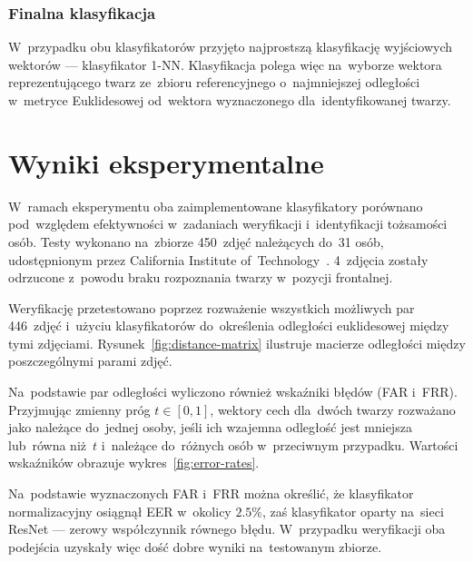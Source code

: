 \documentclass[11pt,a4paper]{article}
\begin{document}
\subsubsection{Finalna klasyfikacja}

W~przypadku obu klasyfikatorów przyjęto najprostszą klasyfikację wyjściowych wektorów --- klasyfikator 1-NN.
Klasyfikacja polega więc na~wyborze wektora reprezentującego twarz ze~zbioru referencyjnego o~najmniejszej odległości w~metryce Euklidesowej od~wektora wyznaczonego dla~identyfikowanej twarzy.

\section{Wyniki eksperymentalne}
\label{sec:results}

W~ramach eksperymentu oba zaimplementowane klasyfikatory porównano pod~względem efektywności w~zadaniach weryfikacji i~identyfikacji tożsamości osób.
Testy wykonano na~zbiorze 450~zdjęć należących do~31 osób, udostępnionym przez California Institute of~Technology~\cite{cvg}.
4~zdjęcia zostały odrzucone z~powodu braku rozpoznania twarzy w~pozycji frontalnej.

Weryfikację przetestowano poprzez rozważenie wszystkich możliwych par 446~zdjęć i~użyciu klasyfikatorów do~określenia odległości euklidesowej między tymi zdjęciami.
Rysunek~\ref{fig:distance-matrix} ilustruje macierze odległości między poszczególnymi parami zdjęć.

Na~podstawie par odległości wyliczono również wskaźniki błędów (FAR i~FRR).
Przyjmując zmienny próg $t \in [0, 1]$, wektory cech dla~dwóch twarzy rozważano jako należące do~jednej osoby, jeśli ich wzajemna odległość jest mniejsza lub~równa niż~$t$ i~należące do~różnych osób w~przeciwnym przypadku.
Wartości wskaźników obrazuje wykres~\ref{fig:error-rates}.

Na~podstawie wyznaczonych FAR i~FRR można określić, że klasyfikator normalizacyjny osiągnął EER w~okolicy $2.5\%$, zaś klasyfikator oparty na~sieci ResNet --- zerowy współczynnik równego błędu.
W~przypadku weryfikacji oba podejścia uzyskały więc dość dobre wyniki na~testowanym zbiorze.
\end{document}
